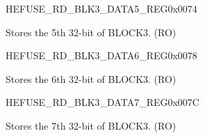 \begin{register}{H}{EFUSE\_RD\_BLK3\_DATA5\_REG}{0x0074}\label{regdesc:EFUSERDBLK3DATA5REG}
%
\regnewline%
\begin{regdesc}\begin{reglist}
\label{fielddesc:EFUSEBLK3DATA5}\item [EFUSE\_BLK3\_DATA5] Stores the 5th 32-bit of BLOCK3. (RO)
\end{reglist}\end{regdesc}
\end{register}


\begin{register}{H}{EFUSE\_RD\_BLK3\_DATA6\_REG}{0x0078}\label{regdesc:EFUSERDBLK3DATA6REG}
%
\regnewline%
\begin{regdesc}\begin{reglist}
\label{fielddesc:EFUSEBLK3DATA6}\item [EFUSE\_BLK3\_DATA6] Stores the 6th 32-bit of BLOCK3. (RO)
\end{reglist}\end{regdesc}
\end{register}


\begin{register}{H}{EFUSE\_RD\_BLK3\_DATA7\_REG}{0x007C}\label{regdesc:EFUSERDBLK3DATA7REG}
%
\regnewline%
\begin{regdesc}\begin{reglist}
\label{fielddesc:EFUSEBLK3DATA7}\item [EFUSE\_BLK3\_DATA7] Stores the 7th 32-bit of BLOCK3. (RO)
\end{reglist}\end{regdesc}
\end{register}


